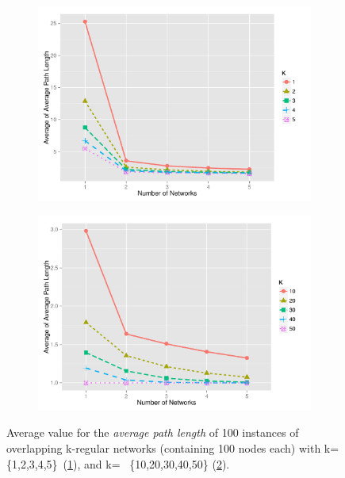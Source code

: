 \documentclass[preprint,number]{elsarticle}
\begin{document}
        \begin{figure}[H] \centering
          \begin{subfigure}{.5\linewidth} \centering
            \includegraphics[width=1\linewidth]{"../analysis/pdf/network_properties_apl_line_kreg_12345"}
            \caption{}
            \label{fig:network_properties_apl_line_kreg_12345}
          \end{subfigure}%
          \begin{subfigure}{.5\linewidth} \centering
            \includegraphics[width=1\linewidth]{"../analysis/pdf/network_properties_apl_line_kreg_1020304050"}
            \caption{}
            \label{fig:network_properties_apl_line_kreg_1020304050}
          \end{subfigure}
     
     \begin{minipage}{0.9\textwidth} \vspace{0.2cm}
            \caption{Average value for the \textit{average path length} of 100 instances of
              overlapping k-regular networks (containing 100 nodes each) with
              k=\{1,2,3,4,5\}~(\ref{fig:network_properties_apl_line_kreg_12345}), and k=
              ~\{10,20,30,40,50\} (\ref{fig:network_properties_apl_line_kreg_1020304050}).}
		\label{fig:network_properties_apl_line_kreg}
              \end{minipage}

        \end{figure}
\end{document}
